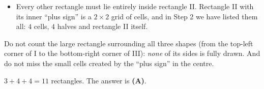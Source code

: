 {\begin{itemize}[leftmargin=1.2em,itemsep=1pt,topsep=1pt]
\item Every other rectangle must lie entirely inside rectangle II. Rectangle II with its inner ``plus sign'' is a $2\times2$ grid of cells, and in Step 2 we have listed them all: $4$ cells, $4$ halves and rectangle II itself.
\end{itemize}
\begin{warnbox}Do not count the large rectangle surrounding all three shapes (from the top-left corner of I to the bottom-right corner of III): \emph{none} of its sides is fully drawn. And do not miss the small cells created by the ``plus sign'' in the centre.\end{warnbox}
$3+4+4=11$ rectangles.
The answer is \textbf{(A)}.
}

